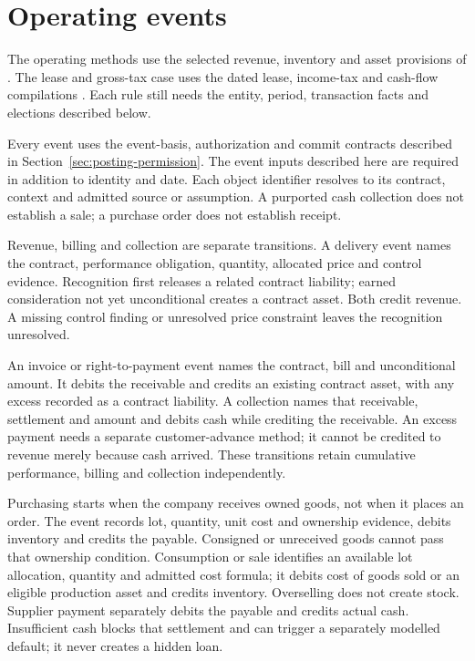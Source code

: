 \hypertarget{operating-events}{%
\section{Operating events}\label{method-corporate-methods-operating-events}}

The operating methods use the selected revenue, inventory and asset provisions of \citet{aasb15dated,aasb102,aasb116dated}. The lease and gross-tax case uses the dated lease, income-tax and cash-flow compilations \citep{aasb16dated,aasb112dated,aasb107dated}. Each rule still needs the entity, period, transaction facts and elections described below.

Every event uses the event-basis, authorization and commit contracts described in Section~\ref{sec:posting-permission}. The event inputs described here are required in addition to identity and date. Each object identifier resolves to its contract, context and admitted source or assumption. A purported cash collection does not establish a sale; a purchase order does not establish receipt.


Revenue, billing and collection are separate transitions. A delivery event names
the contract, performance obligation, quantity, allocated price and control
evidence. Recognition first releases a related contract liability; earned
consideration not yet unconditional creates a contract asset. Both credit
revenue. A missing control finding or unresolved price constraint leaves the
recognition unresolved.

An invoice or right-to-payment event names the contract, bill and unconditional
amount. It debits the receivable and credits an existing contract asset, with
any excess recorded as a contract liability. A collection names that receivable,
settlement and amount and debits cash while crediting the receivable. An excess
payment needs a separate customer-advance method; it cannot be credited to
revenue merely because cash arrived. These transitions retain cumulative
performance, billing and collection independently.

Purchasing starts when the company receives owned goods, not when it places an
order. The event records lot, quantity, unit cost and ownership evidence, debits
inventory and credits the payable. Consigned or unreceived goods cannot pass
that ownership condition. Consumption or sale identifies an available lot
allocation, quantity and admitted cost formula; it debits cost of goods sold
or an eligible production asset and credits inventory. Overselling does not
create stock. Supplier payment separately debits the payable and credits actual
cash. Insufficient cash blocks that settlement and can trigger a separately
modelled default; it never creates a hidden loan.

